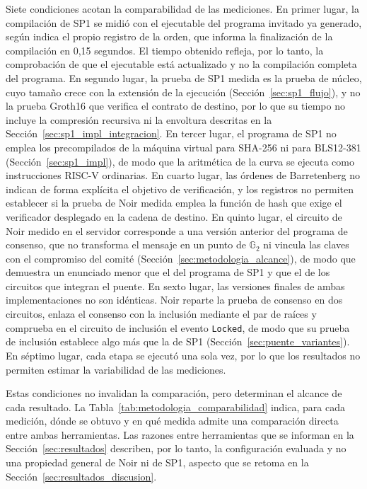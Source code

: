 Siete condiciones acotan la comparabilidad de las mediciones. En primer lugar, la compilación de
SP1 se midió con el ejecutable del programa invitado ya generado, según indica el propio registro
de la orden, que informa la finalización de la compilación en 0,15 segundos. El tiempo obtenido
refleja, por lo tanto, la comprobación de que el ejecutable está actualizado y no la compilación
completa del programa. En segundo lugar, la prueba de SP1 medida es la prueba de núcleo, cuyo
tamaño crece con la extensión de la ejecución (Sección~\ref{sec:sp1_flujo}), y no la prueba
Groth16 que verifica el contrato de destino, por lo que su tiempo no incluye la compresión
recursiva ni la envoltura descritas en la Sección~\ref{sec:sp1_impl_integracion}. En tercer lugar,
el programa de SP1 no emplea los precompilados de la máquina virtual para SHA-256 ni para
BLS12-381 (Sección~\ref{sec:sp1_impl}), de modo que la aritmética de la curva se ejecuta como
instrucciones RISC-V ordinarias. En cuarto lugar, las órdenes de Barretenberg no
indican de forma explícita el objetivo de verificación, y los registros no permiten establecer si
la prueba de Noir medida emplea la función de hash que exige el verificador desplegado en la
cadena de destino. En quinto lugar, el circuito de Noir medido en el servidor corresponde a una
versión anterior del programa de consenso, que no transforma el mensaje en un punto de
$\mathbb{G}_2$ ni vincula las claves con el compromiso del comité
(Sección~\ref{sec:metodologia_alcance}), de modo que demuestra un enunciado menor que el del
programa de SP1 y que el de los circuitos que integran el puente. En sexto lugar, las versiones finales de ambas implementaciones no son idénticas. Noir reparte
la prueba de consenso en dos circuitos, enlaza el consenso con la inclusión mediante el par de
raíces y comprueba en el circuito de inclusión el evento \texttt{Locked}, de modo que su prueba de
inclusión establece algo más que la de SP1 (Sección~\ref{sec:puente_variantes}). En séptimo lugar,
cada etapa se ejecutó una sola vez, por lo que los resultados no permiten estimar la variabilidad
de las mediciones.

Estas condiciones no invalidan la comparación, pero determinan el alcance de cada resultado. La
Tabla~\ref{tab:metodologia_comparabilidad} indica, para cada medición, dónde se obtuvo y en qué
medida admite una comparación directa entre ambas herramientas. Las razones entre herramientas
que se informan en la Sección~\ref{sec:resultados} describen, por lo tanto, la configuración
evaluada y no una propiedad general de Noir ni de SP1, aspecto que se retoma en la
Sección~\ref{sec:resultados_discusion}.

